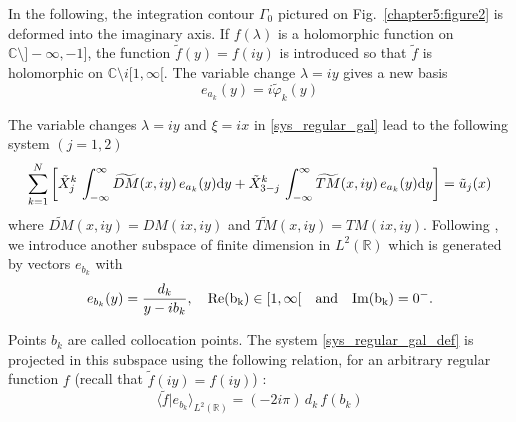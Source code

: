 In the following, the integration contour $\Gamma_0$ pictured on Fig.~\ref{chapter5:figure2} is deformed into the imaginary axis. If $f(\lambda)$ is a holomorphic function on $\mathbb{C}\setminus  ]-\infty,-1]$, the function $\tilde f (y)=f(iy)$ is introduced so that $\tilde f$ is holomorphic on $\mathbb{C}\setminus i [1,\infty[ $. The variable change $\lambda = iy$ gives a new basis
\begin{equation}
e_{a_k}(y) = i\tilde \varphi_k(y)
\end{equation}

The variable changes $\lambda = iy$ and $\xi = ix$ in \eqref{sys_regular_gal} lead to the following system $(j=1,2)$
\begin{equation}
\label{sys_regular_gal_def}
\sum_{k=1}^N \left[ \tilde{X}_j^k \, \int_{-\infty}^\infty  \widetilde{DM}(x,iy) \, e_{a_k}(y) {\rm d} y + \tilde{X}_{3-j}^k \, \int_{-\infty}^\infty  \widetilde{TM}(x,iy) \, e_{a_k}(y) {\rm d} y \right] = \tilde u_j(x) \\
\end{equation}
where $\widetilde{DM}(x,iy) = DM(ix,iy)$ and $\widetilde{TM}(x,iy) = TM(ix,iy)$. Following \cite{CroisilleLebeau}, we introduce another subspace of finite dimension in $L^2(\mathbb{R})$ which is generated by vectors $e_{b_k}$ with
\begin{equation}
\label{points_collocation}
e_{b_k}(y)=\frac{d_k}{y-ib_k}, \quad  \rm Re (b_k) \in [1,\infty[  \quad \text{and}  \quad {\rm Im} (b_k) = 0^-.
\end{equation}

Points $b_k$ are called collocation points.  The system \eqref{sys_regular_gal_def} is projected in this subspace using the following relation, for an arbitrary regular function $f$ (recall that $\tilde{f}(iy)=f(iy)$) :
\begin{equation}
\label{dot_product}
\langle \tilde f\vert e_{b_k}\rangle_{L^2(\mathbb R)}= (-2i\pi) \, d_k \,  f (b_k)
\end{equation}

